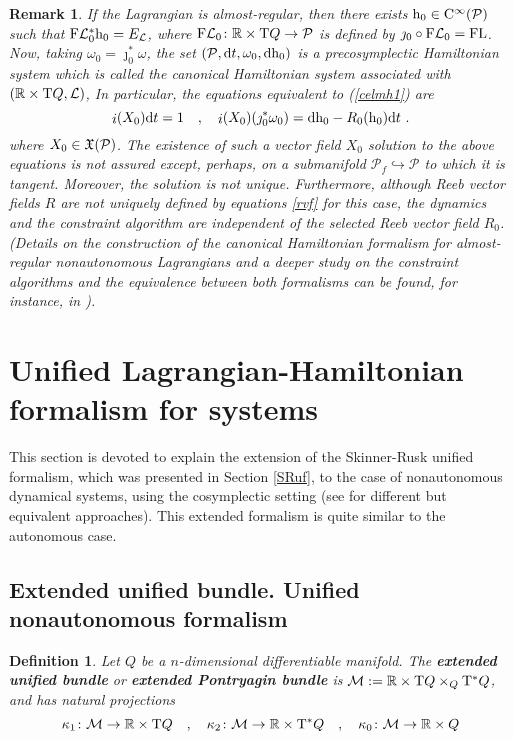 \documentclass[12pt]{report}
\newtheorem{definition}[teor]{Definition}
\newtheorem{remark}[teor]{Remark}
\def\vf{\mathfrak X}
\def\Lag{{\cal L}}
\def\d{{\rm d}}
\def\Real{\mathbb{R}}
\def\Tan{{\rm T}}
\def\inn{\mathop{i}\nolimits}
\def\Cinfty{{\rm C}^\infty}
\begin{document}
\begin{remark}{\rm 
If the Lagrangian is almost-regular, then there exists
${\rm h}_0\in\Cinfty(\mathcal{P})$ such that 
${\rm F}\Lag_0^*{\rm h}_0=E_\Lag$, where
${\rm F}\Lag_0\colon\Real\times\Tan Q\to \mathcal{P}$ is defined by
$\jmath_0\circ{\rm F}\Lag_0={\rm FL}$. 
Now, taking $\omega_0=\jmath_0^*\omega$, the set
$(\mathcal{P},\d t,\omega_0,\d{\rm h}_0)$ is a precosymplectic 
Hamiltonian system which is called the {\sl canonical Hamiltonian system}
associated with $(\Real\times\Tan Q,\Lag)$, 
In particular, the equations equivalent to (\ref{celmh1}) are
$$
\inn(X_0)\d t=1\quad ,\quad
\inn(X_0)(\jmath_0^*\omega_0) =
\d {\rm h}_0-R_0({\rm h}_0)\d t \  .
$$
where $X_0\in\vf({\cal P})$. The existence of such a vector field
$X_0$ solution to the above equations is not
assured except, perhaps, on a submanifold 
$\mathcal{P}_f\hookrightarrow \mathcal{P}$
to which it is tangent. Moreover, the solution is not unique.
Furthermore, although Reeb vector fields $R$ are not uniquely defined by
equations \eqref{rvf} for this case,
the dynamics and the constraint algorithm are independent 
of the selected Reeb vector field $R_0$.
(Details on the construction of the canonical Hamiltonian formalism for
almost-regular nonautonomous Lagrangians and a deeper study on the constraint algorithms 
and the equivalence between both formalisms
can be found, for instance, in
\cite{CF-93,CLM-94,HL-dstd,LMM-96b,LMMMR-02,Vig-00}).
}\end{remark}


\section{Unified Lagrangian-Hamiltonian formalism for  systems}


This section is devoted to explain the extension of the 
Skinner-Rusk unified formalism, which was presented in
Section \ref{SRuf}, to the case of nonautonomous dynamical systems, using the cosymplectic setting
(see \cite{BEMMR-2008,CMC-2002,GM-05}
for different but equivalent approaches).
This extended formalism is quite similar to the autonomous case.


\subsection{Extended unified bundle. Unified nonautonomous formalism}


\begin{definition}
Let $Q$ be a $n$-dimensional differentiable manifold.
The \textbf{extended unified bundle} or \textbf{extended Pontryagin bundle} is
 ${\mathcal M}:=
 \Real\times\Tan Q \times_Q\Tan^*Q$, and has natural projections
$$
\kappa_1\colon{\mathcal M} \to\Real \times\Tan Q \quad , \quad
\kappa_2\colon{\mathcal M} \to\Real \times\Tan^*Q \quad , \quad
\kappa_0\colon{\mathcal M} \to\Real \times Q 
$$
\end{definition}
\end{document}
